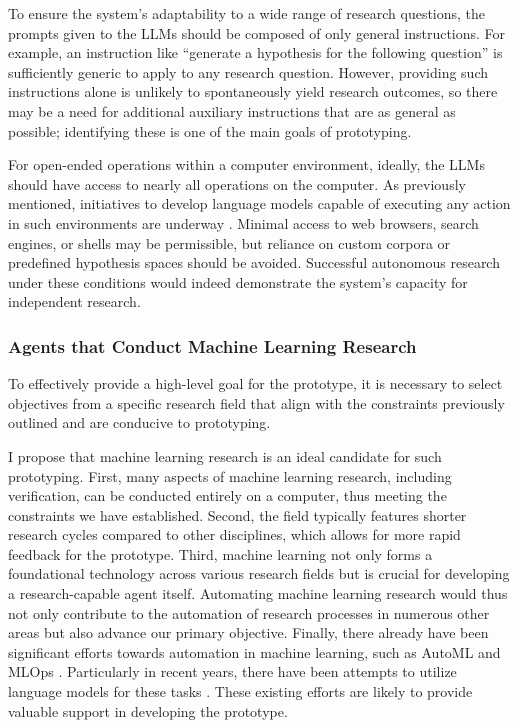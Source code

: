 \documentclass{article}
\begin{document}
To ensure the system's adaptability to a wide range of research questions, the prompts given to the LLMs should be composed of only general instructions. For example, an instruction like ``generate a hypothesis for the following question'' is sufficiently generic to apply to any research question. However, providing such instructions alone is unlikely to spontaneously yield research outcomes, so there may be a need for additional auxiliary instructions that are as general as possible; identifying these is one of the main goals of prototyping.

For open-ended operations within a computer environment, ideally, the LLMs should have access to nearly all operations on the computer. As previously mentioned, initiatives to develop language models capable of executing any action in such environments are underway \cite{openai_chatgpt_plugins_code_interpreter_2023,openinterpreter}. Minimal access to web browsers, search engines, or shells may be permissible, but reliance on custom corpora or predefined hypothesis spaces should be avoided. Successful autonomous research under these conditions would indeed demonstrate the system's capacity for independent research.

\subsubsection{Agents that Conduct Machine Learning Research}
To effectively provide a high-level goal for the prototype, it is necessary to select objectives from a specific research field that align with the constraints previously outlined and are conducive to prototyping.

I propose that machine learning research is an ideal candidate for such prototyping. First, many aspects of machine learning research, including verification, can be conducted entirely on a computer, thus meeting the constraints we have established. Second, the field typically features shorter research cycles compared to other disciplines, which allows for more rapid feedback for the prototype. Third, machine learning not only forms a foundational technology across various research fields but is crucial for developing a research-capable agent itself. Automating machine learning research would thus not only contribute to the automation of research processes in numerous other areas but also advance our primary objective. Finally, there already have been significant efforts towards automation in machine learning, such as AutoML \cite{hutter2019automated,bischl2023hyperparameter,lindauer2020best,white2023neural} and MLOps \cite{kreuzberger2023machine}. Particularly in recent years, there have been attempts to utilize language models for these tasks \cite{zheng2023can,zhang2023automl,vijay2023prompt}. These existing efforts are likely to provide valuable support in developing the prototype.
\end{document}
